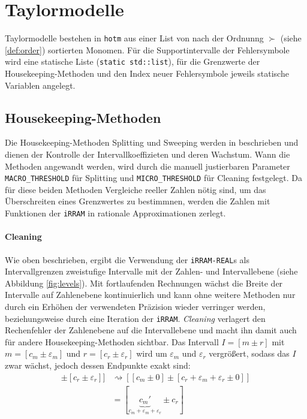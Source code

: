 \newpage
\section{Taylormodelle}
Taylormodelle bestehen in \verb+hotm+ aus einer List von nach der Ordnunng $\succ$ (siehe \ref{def:order}) sortierten Monomen. Für die Supportintervalle der Fehlersymbole wird eine statische Liste (\verb+static std::list+), für die Grenzwerte der Housekeeping-Methoden und den Index neuer Fehlersymbole jeweils statische Variablen angelegt.
\subsection{Housekeeping-Methoden}
Die Housekeeping-Methoden Splitting und Sweeping werden in \cite{DBLP:conf/macis/BrausseKM15} beschrieben und dienen der Kontrolle der Intervallkoeffizieten und deren Wachstum. Wann die Methoden angewandt werden, wird durch die manuell justierbaren Parameter \verb+MACRO_THRESHOLD+ für Splitting und \verb+MICRO_THRESHOLD+ für Cleaning festgelegt. Da für diese beiden Methoden Vergleiche reeller Zahlen nötig sind, um das Überschreiten eines Grenzwertes zu bestimmnen, werden die Zahlen mit Funktionen der \verb+iRRAM+ in rationale Approximationen zerlegt.

\paragraph{Cleaning}
Wie oben beschrieben, ergibt die Verwendung der \verb+iRRAM-REAL+s als Intervallgrenzen zweistufige Intervalle mit der Zahlen- und Intervallebene (siehe Abbildung \ref{fig:levels}). Mit fortlaufenden Rechnungen wächst die Breite der Intervalle auf Zahlenebene kontinuierlich und kann ohne weitere Methoden nur durch ein Erhöhen der verwendeten Präzision wieder verringer werden, beziehungsweise durch eine Iteration der \verb+iRRAM+. \textit{Cleaning} verlagert den Rechenfehler der Zahlenebene auf die Intervallebene und macht ihn damit auch für andere Housekeeping-Methoden sichtbar. Das Intervall $I=[m \pm r]$ mit $m=[c_m \pm \varepsilon_m]$ und $r = [c_r \pm \varepsilon_r]$ wird um $\varepsilon_m$ und $\varepsilon_r$ vergrößert, sodass das $I$ zwar wächst, jedoch dessen Endpunkte exakt sind:
\begin{align*}[[c_m \pm \varepsilon_m] \pm [c_r \pm \varepsilon_r]] &\rightsquigarrow [[c_m \pm 0] \pm [c_r + \varepsilon_m +\varepsilon_r  \pm 0]] \\
&= [\underbrace{c_m'}_{c_m + \varepsilon_m +\varepsilon_r} \pm c_r ]\end{align*}
    
